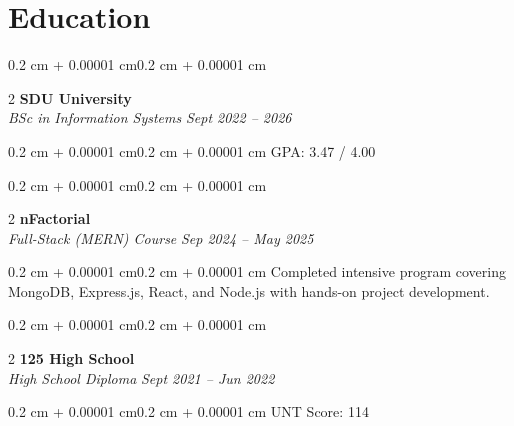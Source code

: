 \documentclass[10pt, letterpaper]{article}
\newenvironment{highlights}{\begin{itemize}[topsep=0.10 cm,parsep=0.10 cm,partopsep=0pt,itemsep=0pt,leftmargin=0.4 cm + 10pt]}{\end{itemize}}
\newenvironment{onecolentry}{\begin{adjustwidth}{0.2 cm + 0.00001 cm}{0.2 cm + 0.00001 cm}}{\end{adjustwidth}}
\newenvironment{twocolentry}[2][]{\onecolentry\def\secondColumn{#2}\setcolumnwidth{\fill, 4.5 cm}\begin{paracol}{2}}{\switchcolumn \raggedleft \secondColumn\end{paracol}\endonecolentry}
\begin{document}
\section{Education}

\begin{twocolentry}{\textit{Sept 2022 – 2026}}
\textbf{SDU University}\\
\textit{BSc in Information Systems}
\end{twocolentry}
\vspace{0.10 cm}
\begin{onecolentry}
GPA: 3.47 / 4.00
\end{onecolentry}

\begin{twocolentry}{\textit{Sep 2024 – May 2025}}
\textbf{nFactorial}\\
\textit{Full-Stack (MERN) Course}
\end{twocolentry}
\vspace{0.10 cm}
\begin{onecolentry}
Completed intensive program covering MongoDB, Express.js, React, and Node.js with hands-on project development.
\end{onecolentry}


\begin{twocolentry}{\textit{Sept 2021 – Jun 2022}}
\textbf{125 High School}\\
\textit{High School Diploma}
\end{twocolentry}
\vspace{0.10 cm}
\begin{onecolentry}
UNT Score: 114
\end{onecolentry}


\end{document}

